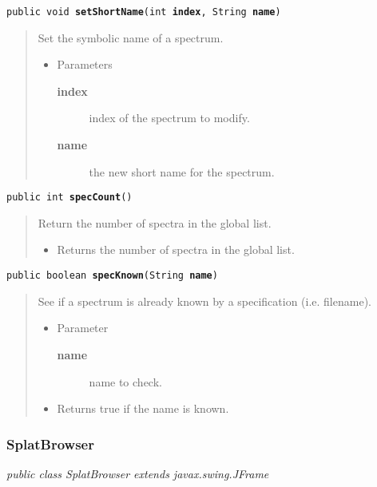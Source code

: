 \documentclass[twoside,11pt,nolof]{starlink}
\providecommand{\startsection}[4]{
   \subsubsection{\label{#3}{#2}}
   #4
}
\providecommand{\method}[1]{\texttt{#1}}
\newenvironment{desc}{\begin{quote}}{\end{quote}}
\begin{document}
\method{public void \textbf{setShortName}(\texttt{int} \textbf{index}, \texttt{String} \textbf{name})\label{l330}\label{l331}}
\begin{desc}Set the symbolic name of a spectrum.
\begin{itemize}
\item{Parameters
  \begin{description}
   \item[\textbf{index}]{index of the spectrum to modify.}
   \item[\textbf{name}]{the new short name for the spectrum.}
  \end{description}}
\end{itemize}
\end{desc}

\method{public int \textbf{specCount}()\label{l332}\label{l333}}
\begin{desc}Return the number of spectra in the global list.
\begin{itemize}
\item{Returns the number of spectra in the global list. }
\end{itemize}
\end{desc}

\method{public boolean \textbf{specKnown}(\texttt{String} \textbf{name})\label{l334}\label{l335}}
\begin{desc}See if a spectrum is already known by a specification (i.e. filename).
\begin{itemize}
\item{Parameter
  \begin{description}
   \item[\textbf{name}]{name to check.}
  \end{description}}
\end{itemize}
\begin{itemize}
\item{Returns true if the name is known. }
\end{itemize}
\end{desc}

\startsection{Class}{SplatBrowser}{l260}

\fbox{\parbox{\textwidth}{
\textit{public
 class SplatBrowser extends javax.swing.JFrame}
}} %



\end{document}
